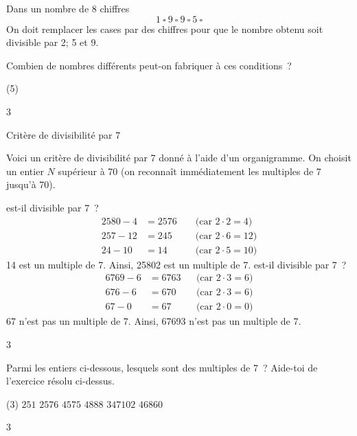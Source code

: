 \documentclass[a4paper,11pt]{report}
\begin{document}
\begin{exo}{
    Dans un nombre de 8 chiffres {\large \[1~\square~9~\square~9~\square~5~\square \] }On doit remplacer les cases par des chiffres pour que le nombre obtenu soit divisible par 2; 5 et 9.

    Combien de nombres différents peut-on fabriquer à ces conditions~?
    \begin{tasks}(5)
\end{tasks}
}{3}\end{exo}


\begin{resolu}{Critère de divisibilité par 7}{
    Voici un critère de divisibilité par 7 donné à l'aide d'un organigramme. On choisit un entier $N$ supérieur à 70 (on reconnaît immédiatement les multiples de 7 jusqu'à 70).

    \begin{center}

\end{center}

\begin{tasks}
     est-il divisible par 7~?
    {\color{blue}
	    \begin{align*}
		    2580-4&=2576 &&\text{ (car }2\cdot2=4) \\
		    257-12&=245 &&\text{ (car }2\cdot6=12) \\
		    24-10&=14 &&\text{ (car } 2\cdot5=10)
\end{align*}   
14 est un multiple de 7. Ainsi, 25802 est un multiple de 7.}
     est-il divisible par 7~?
    {\color{blue}
	    \begin{align*}
		    6769-6&=6763 &&\text{(car }2\cdot3=6) \\
		    676-6&=670 &&\text{(car }2\cdot3=6) \\
		    67-0&=67 &&\text{(car }2\cdot0=0)
\end{align*}
    67 n'est pas un multiple de 7. Ainsi, 67693 n'est pas un multiple de 7.}
\end{tasks}
}{3}\end{resolu}

\begin{exo}{
Parmi les entiers ci-dessous, lesquels sont des multiples de 7~? Aide-toi de l'exercice résolu ci-dessus. 
\begin{tasks}(3)
	\task[] $251$ \task[] $2576$ \task[] $4575$ \task[] $4888$ \task[] $347102$ \task[] $46860$
\end{tasks}
}{3}\end{exo}
\end{document}
